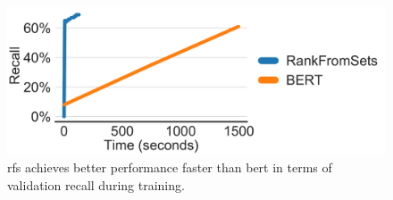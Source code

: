 \begin{figure}[h]
  \centering
  \includegraphics[width=0.8\linewidth]{fig/training-recall}
  \caption{\acrshort{rfs} achieves better performance faster than \acrshort{bert} in terms of validation recall during training.}
  \label{fig:training-recall}
\end{figure}